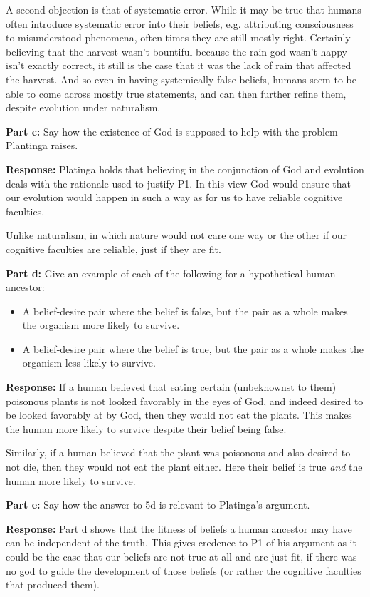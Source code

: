 \documentclass{article}
\begin{document}
A second objection is that of systematic error. While it may be true that humans often introduce systematic error into their beliefs, e.g. attributing consciousness to misunderstood phenomena, often times they are still mostly right. Certainly believing that the harvest wasn't bountiful because the rain god wasn't happy isn't exactly correct, it still is the case that it was the lack of rain that affected the harvest. And so even in having systemically false beliefs, humans seem to be able to come across mostly true statements, and can then further refine them, despite evolution under naturalism.
\bigskip

\noindent\textbf{Part c:} Say how the existence of God is supposed to help with the problem Plantinga raises.
\bigskip

\noindent\textbf{Response:} Platinga holds that believing in the conjunction of God and evolution deals with the rationale used to justify P1. In this view God would ensure that our evolution would happen in such a way as for us to have reliable cognitive faculties. 

Unlike naturalism, in which nature would not care one way or the other if our cognitive faculties are reliable, just if they are fit.
\bigskip

\noindent\textbf{Part d:} Give an example of each of the following for a hypothetical human ancestor:
\begin{itemize}
    \item A belief-desire pair where the belief is false, but the pair as a whole makes the organism more likely to survive.
    \item A belief-desire pair where the belief is true, but the pair as a whole makes the organism less likely to survive.
\end{itemize}
\bigskip

\noindent\textbf{Response:} If a human believed that eating certain (unbeknownst to them) poisonous plants is not looked favorably in the eyes of God, and indeed desired to be looked favorably at by God, then they would not eat the plants. This makes the human more likely to survive despite their belief being false.

Similarly, if a human believed that the plant was poisonous and also desired to not die, then they would not eat the plant either. Here their belief is true \textit{and} the human more likely to survive.
\bigskip

\noindent\textbf{Part e:} Say how the answer to 5d is relevant to Platinga’s argument.
\bigskip

\noindent\textbf{Response:} Part d shows that the fitness of beliefs a human ancestor may have can be independent of the truth. This gives credence to P1 of his argument as it could be the case that our beliefs are not true at all and are just fit, if there was no god to guide the development of those beliefs (or rather the cognitive faculties that produced them).
\end{document}
